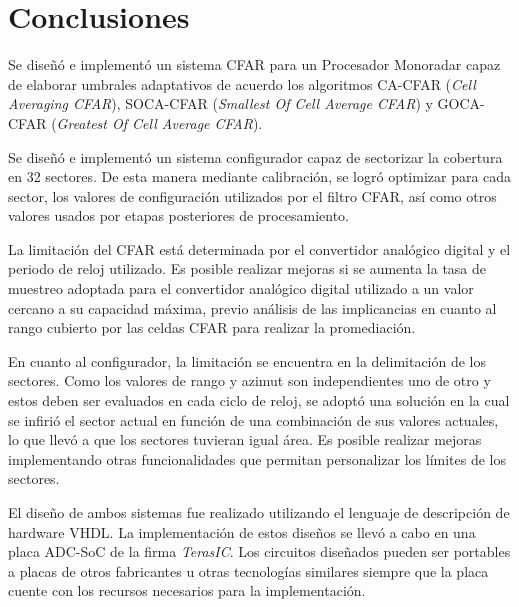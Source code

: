 
\chapter{Conclusiones} %

\label{Chapter5} %




Se diseñó e implementó un sistema CFAR para un Procesador Monoradar capaz de elaborar umbrales adaptativos de acuerdo los algoritmos CA-CFAR (\textit{Cell Averaging CFAR}), SOCA-CFAR (\textit{Smallest Of Cell Average CFAR}) y GOCA-CFAR (\textit{Greatest Of Cell Average CFAR}).

Se diseñó e implementó un sistema configurador capaz de sectorizar la cobertura en 32 sectores. De esta manera mediante calibración, se logró optimizar para cada sector, los valores de configuración utilizados por el filtro CFAR, así como otros valores usados por etapas posteriores de procesamiento.


La limitación del CFAR está determinada por el convertidor analógico digital y el periodo de reloj utilizado. Es posible realizar mejoras si se aumenta la tasa de muestreo adoptada para el convertidor analógico digital utilizado a un valor cercano a su capacidad máxima, previo análisis de las implicancias en cuanto al rango cubierto por las celdas CFAR para realizar la promediación.


En cuanto al configurador, la limitación se encuentra en la delimitación de los sectores. Como los valores de rango y azimut son independientes uno de otro y estos deben ser evaluados en cada ciclo de reloj, se adoptó una solución en la cual se infirió el sector actual en función de una combinación de sus valores actuales, lo que llevó a que los sectores tuvieran igual área. Es posible realizar mejoras implementando otras funcionalidades que permitan personalizar los límites de los sectores.


El diseño de ambos sistemas fue realizado utilizando el lenguaje de descripción de hardware VHDL. La implementación de estos diseños se llevó a cabo en una placa ADC-SoC de la firma \textit{TerasIC}. Los circuitos diseñados pueden ser portables a placas de otros fabricantes u otras tecnologías similares siempre que la placa cuente con los recursos necesarios para la implementación.

